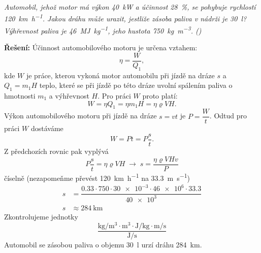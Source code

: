 \begin{mdframed}[style=mdexam]
  \begin{example}\label{FYZ:exam031}
    \emph{Automobil, jehož motor má výkon \qty{40}{\kW}  a účinnost \qty{28}{\percent}, se pohybuje
    rychlostí \qty{120}{\km\per\hour}. Jakou dráhu může urazit, jestliže zásoba paliva v nádrži je
    \qty{30}{\litre}? Výhřevnost paliva je \qty{46}{\mega\joule\per\kg}, jeho hustota
    \qty{750}{\kg\per\cubic\m}. (\cite[s.~33]{Bartuska1997})}
    
    \textbf{Řešení:}\newline 
    Účinnost automobilového motoru je určena vztahem:
    \begin{equation*}
      \eta = \dfrac{W}{Q_1},
    \end{equation*}
    kde \(W\) je práce, kterou vykoná motor automobilu při jízdě na dráze \(s\) a \(Q_1 = m_1H\)
    teplo, které se při jízdě po této dráze uvolní spálením paliva o hmotnosti \(m_1\) a výhřevnost
    \(H\). Pro práci \(W\) proto platí: 
    \begin{equation*}
     W = \eta Q_1 = \eta m_1H = \eta\varrho VH.
    \end{equation*}
    Výkon automobilového motoru při jízdě na dráze \(s = vt\) je \(P=\dfrac{W}{t}\). Odtud pro práci
    \(W\) dostáváme
    \begin{equation*}
      W = Pt = P\dfrac{s}{t}. 
    \end{equation*}
    Z předchozích rovnic pak vyplývá
    \begin{equation*}
      P\dfrac{s}{t} = \eta\varrho VH \;\rightarrow\; s = \dfrac{\eta\varrho VHv}{P}
    \end{equation*}
    číselně (nezapomeňme převést \qty{120}{\km\per\hour} na \qty{33.3}{\m\per\s})
    \begin{align*}
       s  &=\dfrac{\num{0.33}\cdot750\cdot\num{30e-3}\cdot\num{46e6}\cdot\num{33.3}}{\num{40e3}}  \\
       s  &\approx \qty{284}{\km}    
    \end{align*}
    Zkontrolujeme jednotky
    \begin{equation*}
      \dfrac{\unit{\kg\per\cubic\m}\cdot\unit{\cubic\m}\cdot\unit{\joule\per\kg}\cdot\unit{\m\per\s}}
            {\unit{\joule\per\s}}  
    \end{equation*}  
    Automobil se zásobou paliva o objemu \qty{30}{\litre} urzí dráhu \qty{284}{\km}.
  \end{example} 
\end{mdframed}